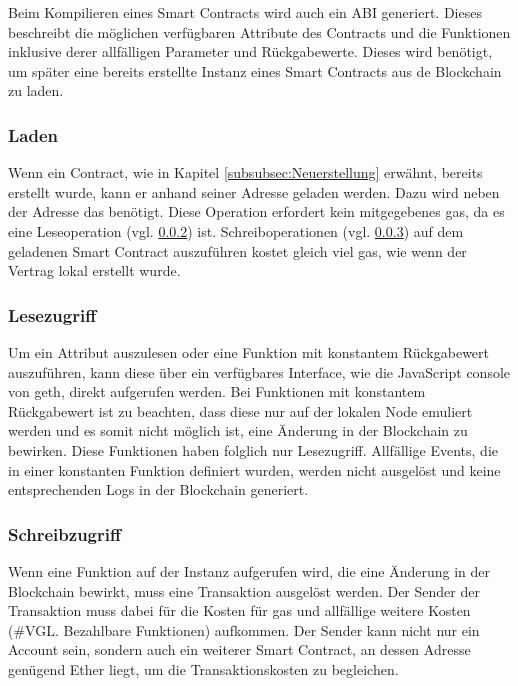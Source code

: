 Beim Kompilieren eines Smart Contracts wird auch ein \acrfull{ABI} generiert. Dieses beschreibt die möglichen verfügbaren Attribute des Contracts und die Funktionen inklusive derer allfälligen Parameter und Rückgabewerte. Dieses wird benötigt, um später eine bereits erstellte Instanz eines Smart Contracts aus de Blockchain zu laden. \cite{media.consensys.net/events-and-logs}

\subsubsection{Laden}
Wenn ein Contract, wie in Kapitel \ref{subsubsec:Neuerstellung} erwähnt, bereits erstellt wurde, kann er anhand seiner Adresse geladen werden.\cite[Solidity in Depth/Contracts/Creating Contracts]{solidity.readthedocs.io} Dazu wird neben der Adresse das  benötigt. Diese Operation erfordert kein mitgegebenes gas, da es eine Leseoperation (vgl. \ref{subsubsec:Lesezugriff}) ist. Schreiboperationen (vgl. \ref{subsubsec:Schreibzugriff}) auf dem geladenen Smart Contract auszuführen kostet gleich viel gas, wie wenn der Vertrag lokal erstellt wurde.

\subsubsection{Lesezugriff}
\label{subsubsec:Lesezugriff}
Um ein Attribut auszulesen oder eine Funktion mit konstantem Rückgabewert auszuführen, kann diese über ein verfügbares Interface, wie die JavaScript console von geth, direkt aufgerufen werden. Bei Funktionen mit konstantem Rückgabewert ist zu beachten, dass diese nur auf der lokalen Node emuliert werden und es somit nicht möglich ist, eine Änderung in der Blockchain zu bewirken.\cite{media.consensys.net/events-and-logs} Diese Funktionen haben folglich nur Lesezugriff. Allfällige Events, die in einer konstanten Funktion definiert wurden, werden nicht ausgelöst und keine entsprechenden Logs in der Blockchain generiert.

\subsubsection{Schreibzugriff}
\label{subsubsec:Schreibzugriff}
Wenn eine Funktion auf der Instanz aufgerufen wird, die eine Änderung in der Blockchain bewirkt, muss eine Transaktion ausgelöst werden. Der Sender der Transaktion muss dabei für die Kosten für gas und allfällige weitere Kosten (\#VGL. Bezahlbare Funktionen) aufkommen. Der Sender kann nicht nur ein Account sein, sondern auch ein weiterer Smart Contract, an dessen Adresse genügend Ether liegt, um die Transaktionskosten zu begleichen.

